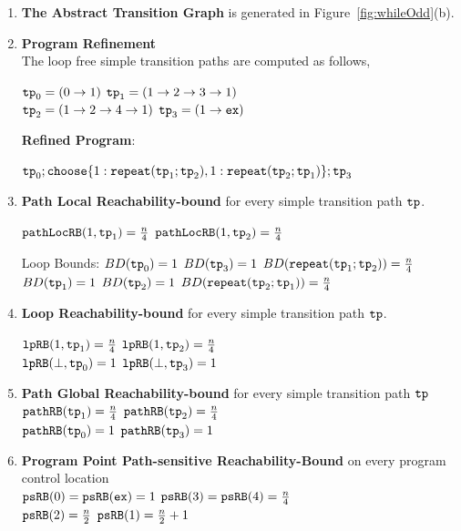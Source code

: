   \begin{enumerate}
    \item  \textbf{The Abstract Transition Graph} is generated in Figure~\ref{fig:whileOdd}(b).
    \item \textbf{Program Refinement}
    \\
    The loop free simple transition paths are computed as follows,

    
      $\mathtt{tp}_0 = (0 \to 1)$
      \quad
      $\mathtt{tp}_1 = (1 \to 2 \to 3 \to 1)$
      \\
      $\mathtt{tp}_2 = (1 \to 2 \to 4 \to 1)$
      \quad
      $\mathtt{tp}_3 = (1 \to \mathtt{ex})$

      
  \textbf{Refined Program}:

    $\tpath_0 ; \rpchoose{1: \rprepeat(\tpath_1; \tpath_2) , 
    1: \rprepeat(\tpath_2; \tpath_1)}; \tpath_3$

    \item \textbf{Path Local Reachability-bound} for every simple transition path $\mathtt{tp}$.

      $\mathtt{pathLocRB}(1, \mathtt{tp}_1) = \frac{n}{4}$ 
      \quad
      $\mathtt{pathLocRB}(1, \mathtt{tp}_2) = \frac{n}{4}$

  Loop Bounds:
        $BD(\mathtt{tp}_0) = 1$
        \quad
       $ BD(\mathtt{tp}_3) = 1$
        \quad
       $ BD(\mathtt{repeat}(\mathtt{tp}_1; \mathtt{tp}_2)) = \frac{n}{4}$
        \\
        $BD(\mathtt{tp}_1) = 1 $
        \quad
        $BD(\mathtt{tp}_2) = 1 $
        \quad
       $ BD(\mathtt{repeat}(\mathtt{tp}_2; \mathtt{tp}_1)) = \frac{n}{4}$
    \item \textbf{{Loop Reachability-bound}} for every simple transition path $\mathtt{tp}$.
    
       $ \mathtt{lpRB}(1, \mathtt{tp}_1) = \frac{n}{4}$
        \qquad
        $\mathtt{lpRB}(1, \mathtt{tp}_2) = \frac{n}{4}$
        \\
        $\mathtt{lpRB}(\bot, \mathtt{tp}_0) = 1$
        \qquad
        $\mathtt{lpRB}(\bot, \mathtt{tp}_3) = 1$
    \item \textbf{Path Global Reachability-bound} for every simple transition path $\mathtt{tp}$
    \\
    $\mathtt{pathRB}(\mathtt{tp}_1) = \frac{n}{4} $ \quad
    $\mathtt{pathRB}(\mathtt{tp}_2) = \frac{n}{4} $ \\
    $\mathtt{pathRB}(\mathtt{tp}_0) = 1$ \quad
    $\mathtt{pathRB}(\mathtt{tp}_3) = 1$ 

    \item \textbf{Program Point Path-sensitive Reachability-Bound} on every program control location
  \\
  $\mathtt{psRB}(0) = \mathtt{psRB}(\mathtt{ex}) = 1$ \quad
  $\mathtt{psRB}(3) = \mathtt{psRB}(4) = \frac{n}{4}$ \\
  $\mathtt{psRB}(2) = \frac{n}{2}$ \quad 
  $\mathtt{psRB}(1) = \frac{n}{2} + 1$
  \end{enumerate}